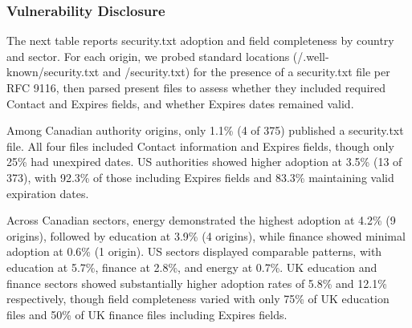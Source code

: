 \documentclass[pdflatex,sn-mathphys-num]{sn-jnl}
\newlength{\inlinecapskip}
\newenvironment{inlinecap}[1][\textwidth]
  {\par\vspace{\inlinecapskip}\noindent\begin{minipage}{#1}\centering}
  {\end{minipage}\par\vspace{\inlinecapskip}}
\numberwithin{equation}{section}
\theoremstyle{thmstyleone}
\theoremstyle{thmstyletwo}%
\theoremstyle{thmstylethree}%
\begin{document}
\subsubsection{Vulnerability Disclosure}

\vspace{1em}The next table reports security.txt adoption and field completeness by country and sector. For each origin, we probed standard locations 
(/.well-known/security.txt and /security.txt) for the presence of a security.txt 
file per RFC 9116, then parsed present files to assess whether they included required Contact and Expires fields, and 
whether Expires dates remained valid.

\begin{inlinecap}
\label{tab:securitytxt_summary}
\centering
\small
\setlength{\tabcolsep}{3pt}
%
\end{inlinecap}

Among Canadian authority origins, only 1.1\% (4 of 375) 
published a security.txt file. All four files included Contact information and Expires fields, 
though only 25\% had unexpired dates. US authorities showed higher adoption at 3.5\% (13 of 373), 
with 92.3\% of those including Expires fields and 83.3\% maintaining valid expiration dates. 

\vspace{1em}Across Canadian sectors, energy demonstrated the highest adoption at 4.2\% (9 origins), 
followed by education at 3.9\% 
(4 origins), while finance showed minimal adoption at 0.6\% (1 origin). US sectors 
displayed comparable patterns, with education at 
5.7\%, finance at 2.8\%, and energy at 0.7\%. UK education and finance sectors showed 
substantially higher adoption rates of 
5.8\% and 12.1\% respectively, though field completeness varied with only 75\% of UK education
files and 50\% of UK finance 
files including Expires fields. 
\end{document}
